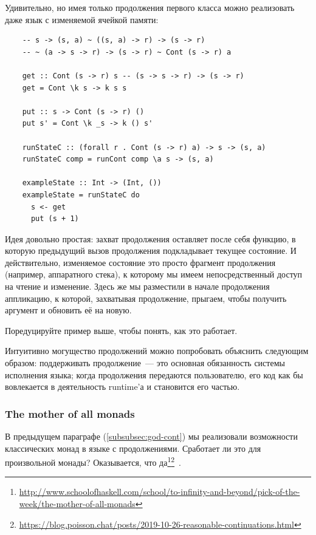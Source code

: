 Удивительно, но имея только продолжения первого класса можно реализовать даже язык с изменяемой ячейкой памяти:
\begin{verbatim}
    -- s -> (s, a) ~ ((s, a) -> r) -> (s -> r)
    -- ~ (a -> s -> r) -> (s -> r) ~ Cont (s -> r) a

    get :: Cont (s -> r) s -- (s -> s -> r) -> (s -> r)
    get = Cont \k s -> k s s

    put :: s -> Cont (s -> r) ()
    put s' = Cont \k _s -> k () s'

    runStateC :: (forall r . Cont (s -> r) a) -> s -> (s, a)
    runStateC comp = runCont comp \a s -> (s, a)

    exampleState :: Int -> (Int, ())
    exampleState = runStateC do
      s <- get
      put (s + 1)
\end{verbatim}
Идея довольно простая: захват продолжения оставляет после себя функцию, в которую предыдущий вызов продолжения подкладывает текущее состояние.
И действительно, изменяемое состояние это просто фрагмент продолжения (например, аппаратного стека), к которому мы имеем непосредственный доступ на чтение и изменение.
Здесь же мы разместили в начале продолжения аппликацию, к которой, захватывая продолжение, прыгаем, чтобы получить аргумент и обновить её на новую.

\begin{task}
    Поредуцируйте пример выше, чтобы понять, как это работает.
\end{task}

Интуитивно могущество продолжений можно попробовать объяснить следующим образом: поддерживать продолжение~--- это основная обязанность системы исполнения языка; когда продолжения передаются пользователю, его код как бы вовлекается в деятельность runtime'а и становится его частью.

\subsubsection{The mother of all monads} \label{subsubsec:monadic-reflection}

В предыдущем параграфе (\ref{subsubsec:god-cont}) мы реализовали возможности классических монад в языке с продолжениями.
Сработает ли это для произвольной монады?
Оказывается, что да\footnote{\url{http://www.schoolofhaskell.com/school/to-infinity-and-beyond/pick-of-the-week/the-mother-of-all-monads}}\footnote{\url{https://blog.poisson.chat/posts/2019-10-26-reasonable-continuations.html}}~\cite{filinski1994representing}.

